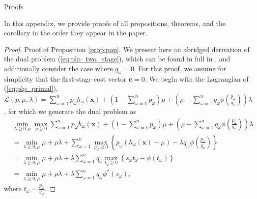 \documentclass[ijoc,letterpaper]{informs3} %
\newcommand{\x}{\mathbf{x}}
\renewcommand{\c}{\mathbf{c}}
\begin{document}
\begin{APPENDIX}{Proofs}

\noindent In this appendix, we provide proofs of all propositions, theorems, and the corollary in the order they appear in the paper. 


\begin{proof}{\sc Proof of Proposition \ref{prop:pop}.}
	We present here an abridged derivation of the dual problem (\ref{eq:plp_two_stage}), which can be found in full in \cite{bental2011robust}, and additionally consider the case where $q_\omega = 0$.
	For this proof, we assume for simplicity that the first-stage cost vector $\c = 0$.	
	We begin with the Lagrangian of (\ref{eq:plp_primal}), $\mathcal{L}(p,\mu,\lambda) = \sum_{\omega=1}^n p_\omega h_\omega(\x) + \left( 1-\sum_{\omega=1}^n p_\omega \right)\mu + \left( \rho - \sum_{\omega=1}^n q_\omega \phi\left(\frac{p_\omega}{q_\omega}\right) \right)\lambda$, for which we generate the dual problem as
	\begin{align}
		 & \min_{\lambda \geq 0, \mu} \max_{p \geq 0} \sum_{\omega=1}^n p_\omega h_\omega(\x) + \left( 1-\sum_{\omega=1}^n p_\omega \right)\mu + \left( \rho - \sum_{\omega=1}^n q_\omega \phi\left(\frac{p_\omega}{q_\omega}\right) \right)\lambda \nonumber \\
		& = \min_{\lambda \geq 0, \mu} \mu + \rho\lambda + \sum_{\omega=1}^n \max_{p_\omega \geq 0} \left\{ p_\omega (h_\omega(\x) - \mu) - \lambda q_\omega \phi\left(\frac{p_\omega}{q_\omega}\right) \right\} \label{eq:pop_proof_detail_1} \\
		& =  \min_{\lambda \geq 0, \mu} \mu + \rho\lambda + \lambda \sum_{\omega=1}^n q_\omega \max_{t_\omega \geq 0} \left\{ s_\omega t_\omega - \phi(t_\omega) \right\} \label{eq:pop_proof_detail_2} \\
		& = \min_{\lambda \geq 0, \mu} \mu + \rho\lambda + \lambda \sum_{\omega=1}^n q_\omega \phi^*\left(s_\omega\right), \nonumber
	\end{align}
	where $t_\omega = \frac{p_\omega}{q_\omega}$.
	

\end{proof}
\end{APPENDIX}
\end{document}
